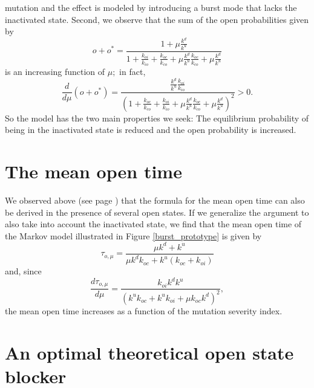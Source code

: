 mutation and the effect is modeled by introducing a burst mode that lacks the
inactivated state. Second, we observe that the sum of the open probabilities
given by%
\begin{equation}
o+o^{\ast}=\frac{1+\mu\frac{k^{d}}{k^{u}}}{1+\frac{k_{oi}}{k_{io}}%
+\frac{k_{oc}}{k_{co}}+\mu\frac{k^{d}}{k^{u}}\frac{k_{oc}}{k_{co}}+\mu
\frac{k^{d}}{k^{u}}}%
\end{equation}
is an increasing function of $\mu;$ in fact,%
\begin{equation}
\frac{d}{d\mu}\left(  o+o^{\ast}\right)  =\frac{\frac{k^{d}}{k^{u}}%
\frac{k_{oi}}{k_{io}}}{\left(  1+\frac{k_{oc}}{k_{co}}+\frac{k_{oi}}{k_{io}%
}+\mu\frac{k^{d}}{k^{u}}\frac{k_{oc}}{k_{co}}+\mu\frac{k^{d}}{k^{u}}\right)
^{2}}>0.
\end{equation}
So the model has the two main properties we seek: The equilibrium
probability of being in the inactivated state is reduced and the open probability
is increased.

\bigskip

\section{The mean open time}

We observed above (see page \pageref{mot_many}) that the formula for the mean open time can also
be derived in the presence of several open states. If we generalize the
argument to also take into account the inactivated state, we find that the
mean open time of the Markov model illustrated in Figure \ref{burst_prototype} is given by%
\begin{equation}
\tau_{o,\mu}=\frac{\mu k^{d}+k^{u}}{\mu k^{d}k_{oc}+k^{u}\left(  k_{oc}%
+k_{oi}\right)  }%
\end{equation}
and, since%
\begin{equation}
\frac{d\tau_{o,\mu}}{d\mu}=\frac{k_{oi}k^{d}k^{u}}{\left(  k^{u}k_{oc}+k^{u}k_{oi}+\mu k_{oc}k^{d}\right)  ^{2}},
\end{equation}
the mean open time increases as a function of the mutation severity index.


\bigskip

\section{An optimal theoretical open state blocker}

